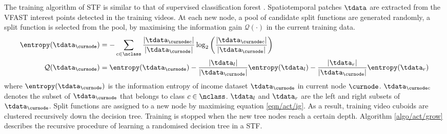 The training algorithm of STF is similar to that of supervised classification forest \cite{Breiman2001}. Spatiotemporal patches $\tdata$ are extracted from the VFAST interest points detected in the training videos. 
At each new node, a pool of candidate split functions are generated randomly, a split function is selected from the pool, by maximising the information gain $\mathcal{Q}(\cdot)$ in the current training data. 
\begin{equation}
	\begin{aligned}
		\entropy(\tdata_{\curnode}) & = -\sum_{c \in \nclass} \frac{|\tdata_{\curnode c}|}{|\tdata_{\curnode}|}\log_{2}\left(\frac{|\tdata_{\curnode c}|}{|\tdata_{\curnode}|}\right)\\ 
		\mathcal{Q}(\tdata_{\curnode}) & = \entropy(\tdata_{\curnode}) - \frac{|\tdata_{l}|}{|\tdata_{\curnode}|}\entropy(\tdata_{l}) - \frac{|\tdata_{r}|}{|\tdata_{\curnode}|}\entropy(\tdata_{r})
	\end{aligned}
	\label{eqn/act/ig}
\end{equation}
where $\entropy(\tdata_{\curnode})$ is the information entropy of income dataset $\tdata_{\curnode}$ in current node $\curnode$. $\tdata_{\curnode c}$ denotes the subset of $\tdata_{\curnode}$ that belongs to class $c \in \nclass$. $\tdata_{l}$ and $\tdata_{r}$ are the left and right subsets of $\tdata_{\curnode}$.
Split functions are assigned to a new node by maximising equation \ref{eqn/act/ig}. As a result, training video cuboids are clustered recursively down the decision tree. Training is stopped when the new tree nodes reach a certain depth. Algorithm \ref{algo/act/grow} describes the recursive procedure of learning a randomised decision tree in a STF.


